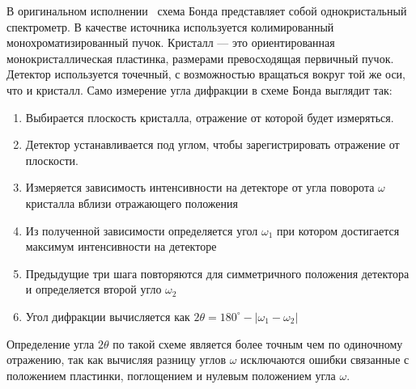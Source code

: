 \documentclass{article}
\begin{document}
В оригинальном исполнении~\cite{bond1960precision} схема Бонда представляет собой однокристальный спектрометр.
В качестве источника используется колимированный монохроматизированный пучок.
Кристалл --- это ориентированная монокристаллическая пластинка, размерами превосходящая первичный пучок.
Детектор используется точечный, с возможностью вращаться вокруг той же оси, что и кристалл.
Само измерение угла дифракции в схеме Бонда выглядит так:
\begin{enumerate}
    \item Выбирается плоскость кристалла, отражение от которой будет измеряться.
    \item Детектор устанавливается под углом, чтобы зарегистрировать отражение от плоскости.
    \item Измеряется зависимость интенсивности на детекторе от угла поворота $\omega$ кристалла вблизи отражающего положения
    \item Из полученной зависимости определяется угол $\omega_1$ при котором достигается максимум интенсивности на детекторе
    \item Предыдущие три шага повторяются для симметричного положения детектора и определяется второй угло $\omega_2$
    \item Угол дифракции вычисляется как $2\theta=180^\circ-|\omega_1-\omega_2|$
\end{enumerate}
Определение угла $2\theta$ по такой схеме является более точным чем по одиночному отражению, так как вычисляя разницу углов $\omega$ исключаются ошибки связанные с положением пластинки, поглощением и нулевым положением угла $\omega$.





\end{document}
